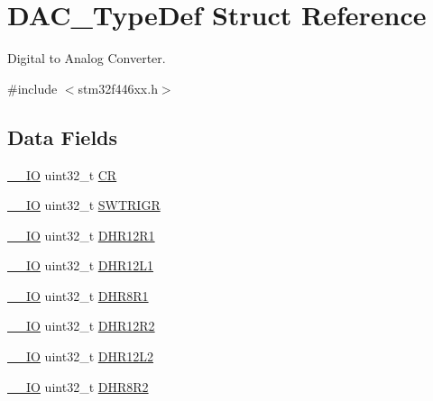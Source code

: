 \hypertarget{struct_d_a_c___type_def}{}\section{D\+A\+C\+\_\+\+Type\+Def Struct Reference}
\label{struct_d_a_c___type_def}


Digital to Analog Converter.  




{\ttfamily \#include $<$stm32f446xx.\+h$>$}

\subsection*{Data Fields}
\begin{DoxyCompactItemize}
\item 
\mbox{\hyperlink{core__sc300_8h_aec43007d9998a0a0e01faede4133d6be}{\+\_\+\+\_\+\+IO}} uint32\+\_\+t \mbox{\hyperlink{struct_d_a_c___type_def_ab40c89c59391aaa9d9a8ec011dd0907a}{CR}}
\item 
\mbox{\hyperlink{core__sc300_8h_aec43007d9998a0a0e01faede4133d6be}{\+\_\+\+\_\+\+IO}} uint32\+\_\+t \mbox{\hyperlink{struct_d_a_c___type_def_a896bbb7153af0b67ad772360feaceeb4}{S\+W\+T\+R\+I\+GR}}
\item 
\mbox{\hyperlink{core__sc300_8h_aec43007d9998a0a0e01faede4133d6be}{\+\_\+\+\_\+\+IO}} uint32\+\_\+t \mbox{\hyperlink{struct_d_a_c___type_def_ac2bb55b037b800a25852736afdd7a258}{D\+H\+R12\+R1}}
\item 
\mbox{\hyperlink{core__sc300_8h_aec43007d9998a0a0e01faede4133d6be}{\+\_\+\+\_\+\+IO}} uint32\+\_\+t \mbox{\hyperlink{struct_d_a_c___type_def_ae9028b8bcb5118b7073165fb50fcd559}{D\+H\+R12\+L1}}
\item 
\mbox{\hyperlink{core__sc300_8h_aec43007d9998a0a0e01faede4133d6be}{\+\_\+\+\_\+\+IO}} uint32\+\_\+t \mbox{\hyperlink{struct_d_a_c___type_def_ad0a200e12acad17a5c7d2059159ea7e1}{D\+H\+R8\+R1}}
\item 
\mbox{\hyperlink{core__sc300_8h_aec43007d9998a0a0e01faede4133d6be}{\+\_\+\+\_\+\+IO}} uint32\+\_\+t \mbox{\hyperlink{struct_d_a_c___type_def_a804c7e15dbb587c7ea25511f6a7809f7}{D\+H\+R12\+R2}}
\item 
\mbox{\hyperlink{core__sc300_8h_aec43007d9998a0a0e01faede4133d6be}{\+\_\+\+\_\+\+IO}} uint32\+\_\+t \mbox{\hyperlink{struct_d_a_c___type_def_a2e45f9c9d67e384187b25334ba0a3e3d}{D\+H\+R12\+L2}}
\item 
\mbox{\hyperlink{core__sc300_8h_aec43007d9998a0a0e01faede4133d6be}{\+\_\+\+\_\+\+IO}} uint32\+\_\+t \mbox{\hyperlink{struct_d_a_c___type_def_a4c435f0e34ace4421241cd5c3ae87fc2}{D\+H\+R8\+R2}}

\end{DoxyCompactItemize}
